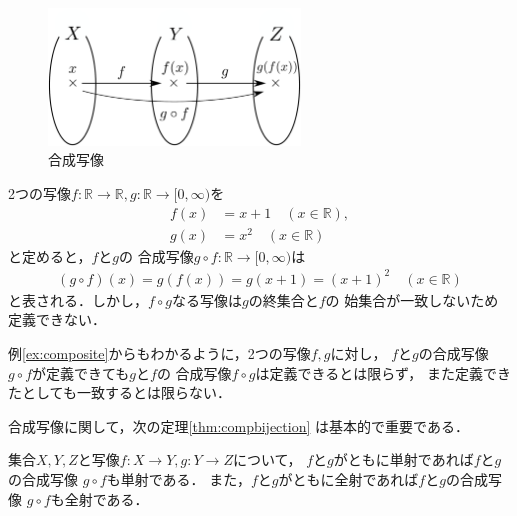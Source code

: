     \begin{figure}[h]
      \centering
      \includegraphics[width=6.7cm]{inputyou/set/picture/setcomposite.pdf}
      \caption{合成写像}
      \label{fig:setcomposite}
    \end{figure}
     

    \begin{ex} \label{ex:composite}
      2つの写像$f: \mathbb{R} \longrightarrow \mathbb{R}
      ,  g: \mathbb{R} \longrightarrow [0, \infty )$を
      \begin{align*}
        f(x) & = x +1 \quad ( x \in \mathbb{R} ), \\
        g(x) & =x^2 \quad ( x \in \mathbb{R} )
      \end{align*}
      と定めると，$f$と$g$の
      合成写像$g \circ f : \mathbb{R} \longrightarrow [0, \infty )$は
      \begin{align*}
        (g \circ f) (x) = g(f(x))=g(x+1) = (x + 1)^2 \quad ( x \in \mathbb{R} ) 
      \end{align*}
      と表される．しかし，$f \circ g$なる写像は$g$の終集合と$f$の
      始集合が一致しないため定義できない．
    \end{ex}  

    例\ref{ex:composite}からもわかるように，2つの写像$f,  g$に対し，
    $f$と$g$の合成写像$g \circ f$が定義できても$g$と$f$の
    合成写像$f \circ g$は定義できるとは限らず，
    また定義できたとしても一致するとは限らない．

    合成写像に関して，次の定理\ref{thm:compbijection}
    は基本的で重要である．

    \begin{thm} \label{thm:compbijection}
      集合$X,  Y,  Z$と写像$f : X \longrightarrow Y,  
      g: Y \longrightarrow Z$について，
      $f$と$g$がともに単射であれば$f$と$g$の合成写像
      $g \circ f$も単射である．
      また，$f$と$g$がともに全射であれば$f$と$g$の合成写像
      $g \circ f$も全射である．
    \end{thm}


